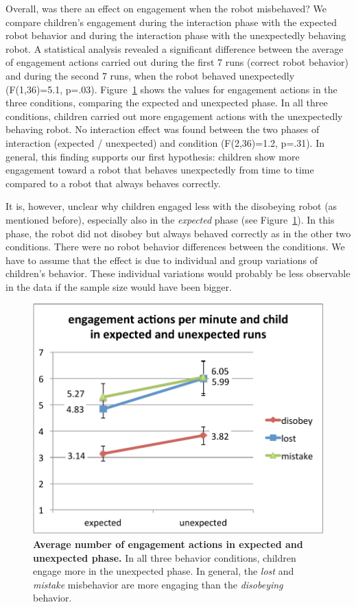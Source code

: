 \documentclass{sig-alternate}
\begin{document}
Overall, was there an effect on engagement when the robot misbehaved? We compare
children's engagement during the interaction phase with the expected robot
behavior and during the interaction phase with the unexpectedly behaving robot.
A statistical analysis revealed a significant difference between the average of
engagement actions carried out during the first 7 runs (correct robot behavior)
and during the second 7 runs, when the robot behaved unexpectedly (F(1,36)=5.1,
p=.03). Figure~\ref{fig:domino-engagement-condition} shows the values for
engagement actions in the three conditions, comparing the expected and
unexpected phase. In all three conditions, children carried out more engagement
actions with the unexpectedly behaving robot. No interaction effect was found
between the two phases of interaction (expected / unexpected) and condition
(F(2,36)=1.2, p=.31). In general, this finding supports our first hypothesis:
children show more engagement toward a robot that behaves unexpectedly from time
to time compared to a robot that always behaves correctly.

It is, however, unclear why children engaged less with the disobeying robot (as
mentioned before), especially also in the \textit{expected} phase (see
Figure~\ref{fig:domino-engagement-condition}). In this phase, the robot did not
disobey but always behaved correctly as in the other two conditions. There were
no robot behavior differences between the conditions. We have to assume that the
effect is due to individual and group variations of children's behavior. These
individual variations would probably be less observable in the data if the
sample size would have been bigger.

\begin{figure}[!t] 
\centering 
\includegraphics[width=0.5\columnwidth]{domino-engagement-condition.pdf} 
\caption[Engagement Actions in Expected and Unexpected Phase]{\small \textbf{Average number of engagement actions in expected and unexpected phase.} In all three behavior conditions, children engage more in the unexpected phase. In general, the \textit{lost} and \textit{mistake} misbehavior are more engaging than the \textit{disobeying} behavior.} 
\label{fig:domino-engagement-condition} 
\end{figure}	
	
\end{document}
